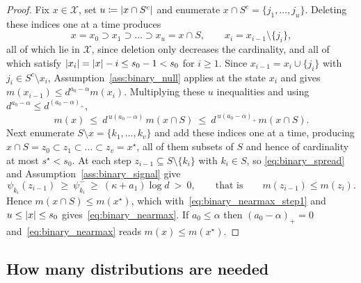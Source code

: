 \documentclass[aos]{imsart}%
\DeclarePairedDelimiter{\abs}{\lvert}{\rvert}
\newcommand{\ambientspace}[0]{\mathcal{X}}
\theoremstyle{plain}
\theoremstyle{definition}
\begin{document}
    \begin{proof}
        Fix $x\in\ambientspace$, set $u\coloneq\abs{x\cap S^{c}}$ and
        enumerate $x\cap S^{c}=\{j_1,\dots,j_u\}$. Deleting these indices one
        at a time produces
        \begin{equation*}
            x=x_0\supset x_1\supset\dots\supset x_u=x\cap S,
            \qquad x_{i}=x_{i-1}\setminus\{j_i\} ,
        \end{equation*}
        all of which lie in $\ambientspace$, since deletion only decreases the
        cardinality, and all of which satisfy $\abs{x_i}=\abs x-i\leq s_0-1<s_0$
        for $i\geq1$. Since $x_{i-1}=x_i\cup\{j_i\}$ with
        $j_i\in S^{c}\setminus x_i$, Assumption~\ref{ass:binary_null} applies
        at the state $x_i$ and gives $m(x_{i-1})\leq d^{a_0-\alpha}m(x_i)$.
        Multiplying these $u$ inequalities and using
        $d^{a_0-\alpha}\leq d^{(a_0-\alpha)_{+}}$,
        \begin{equation}
            \label{eq:binary_nearmax_step1}
            m(x)\ \leq\ d^{\,u(a_0-\alpha)}\,m(x\cap S)
            \ \leq\ d^{\,u(a_0-\alpha)_{+}}\,m(x\cap S).
        \end{equation}
        Next enumerate $S\setminus x=\{k_1,\dots,k_v\}$ and add these indices
        one at a time, producing
        $x\cap S=z_0\subset z_1\subset\dots\subset z_v=x^{\star}$, all of them
        subsets of $S$ and hence of cardinality at most $s^{\star}<s_0$. At
        each step $z_{i-1}\subseteq S\setminus\{k_i\}$ with $k_i\in S$, so
        \eqref{eq:binary_spread} and Assumption~\ref{ass:binary_signal} give
        \begin{equation*}
            \psi_{k_i}(z_{i-1})\ \geq\ \psi_{k_i}^{-}
            \ \geq\ (\kappa+a_1)\log d\ >\ 0,
            \qquad\text{that is}\qquad m(z_{i-1})\leq m(z_i).
        \end{equation*}
        Hence $m(x\cap S)\leq m(x^{\star})$, which
        with~\eqref{eq:binary_nearmax_step1} and $u\leq\abs x\leq s_0$
        gives~\eqref{eq:binary_nearmax}. If $a_0\leq\alpha$ then
        $(a_0-\alpha)_{+}=0$ and~\eqref{eq:binary_nearmax} reads
        $m(x)\leq m(x^{\star})$.
    \end{proof}


    \subsection{How many distributions are needed}
    \label{sub:binary_horizon}
\end{document}
